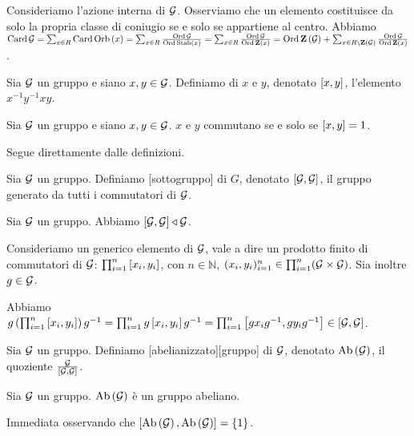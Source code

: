 \Proof
Consideriamo l'azione interna di $\mathcal{G}$.
Osserviamo che un elemento costituisce da solo
la propria classe di coniugio se e solo se appartiene
al centro.
Abbiamo
$\Cardinality{\Group} =
\sum_{x \in R} \Cardinality{\Orbit{x}} =
\sum_{x \in R} \frac{\GroupOrder{\Group}}
{\GroupOrder{\Stabilizer{x}}} =
\sum_{x \in R} \frac{\GroupOrder{\Group}}
{\GroupOrder{\Centralizer{x}}} =
\GroupOrder{\GroupCenter{\Group}} +
\sum_{x \in R \SetMin \GroupCenter{\Group}} \frac{\GroupOrder{\Group}}
{\GroupOrder{\Centralizer{x}}}$.
\EndProof
\begin{Definition}
	Sia $\mathcal{G}$ un gruppo e siano
	$x, y \in \mathcal{G}$. Definiamo
	 di $x$ e $y$,
	denotato $\left [ x,y \right ]$,
	l'elemento $x^{-1}y^{-1}xy$.
\end{Definition}
\begin{Theorem}
	Sia $\mathcal{G}$ un gruppo e siano
	$x, y \in \mathcal{G}$. $x$ e $y$ commutano
	se e solo se $\left [ x,y \right ] = 1$.
\end{Theorem}
\Proof
Segue direttamente dalle definizioni.
\EndProof
\begin{Definition}
	Sia $\mathcal{G}$ un gruppo. Definiamo
	[sottogruppo]
	di $G$, denotato $\left [ \mathcal{G},\mathcal{G} \right ]$,
	il gruppo generato da tutti i commutatori di
	$\mathcal{G}$.
\end{Definition}
\begin{Theorem}
	Sia $\mathcal{G}$ un gruppo.
	Abbiamo $\left [ \mathcal{G},\mathcal{G} \right ] \triangleleft
	\mathcal{G}$.
\end{Theorem}
\Proof
Consideriamo un generico elemento di $\mathcal{G}$,
vale a dire un prodotto finito di commutatori
di $\mathcal{G}$: $\prod_{i = 1}^n \left [ x_i,y_i \right ]$,
con $n \in \mathbb{N}$, $(x_i,y_i)_{i = 1}^n \in
\prod_{i = 1}^n (\mathcal{G} \times \mathcal{G})$.
Sia inoltre $g \in \mathcal{G}$.
\par
Abbiamo $g\left ( \prod_{i = 1}^n \left [ x_i,y_i \right ] \right )g^{-1} =
\prod_{i = 1}^n g\left [ x_i,y_i \right ]g^{-1} =
\prod_{i = 1}^n \left [ gx_ig^{-1},gy_ig^{-1} \right ] \in
\left [ \mathcal{G},\mathcal{G} \right ]$.
\EndProof
\begin{Definition}
	Sia $\mathcal{G}$ un gruppo. Definiamo
	[abelianizzato][gruppo]
	di $\mathcal{G}$, denotato $\text{Ab} \left ( \mathcal{G} \right )$,
	il quoziente $\frac{\mathcal{G}}{\left [ \mathcal{G},\mathcal{G} \right ]}$.
\end{Definition}
\begin{Theorem}
	Sia $\mathcal{G}$ un gruppo.
	$\text{Ab} \left ( \mathcal{G} \right )$ \`e un gruppo abeliano.
\end{Theorem}
\Proof
Immediata osservando che $\left [ \text{Ab} \left ( \mathcal{G} \right ),\text{Ab} \left ( \mathcal{G} \right ) \right ] =
\lbrace 1 \rbrace$.
\EndProof
